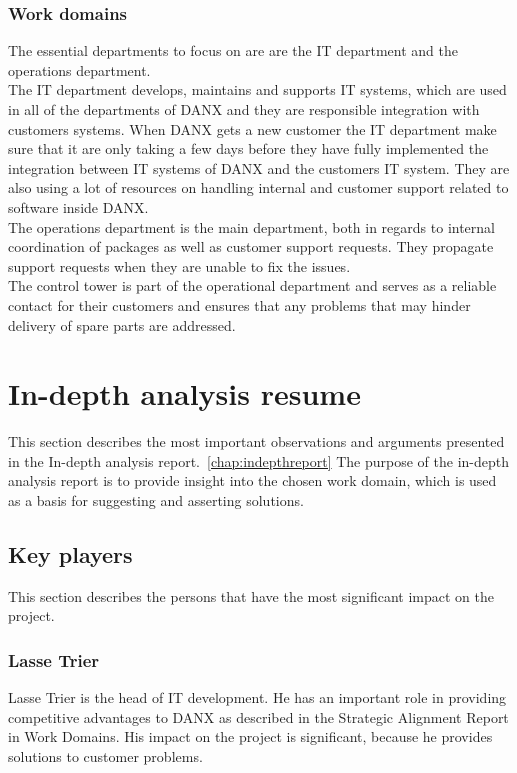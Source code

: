 \subsubsection{Work domains}
The essential departments to focus on are are the IT department and the operations department.\\
The IT department develops, maintains and supports IT systems\cite{lasse015}, which are used in all of the departments of DANX and they are responsible integration with customers systems\cite{lasse008}. When DANX gets a new customer the IT department make sure that it are only taking a few days\cite{lasse008} before they have fully implemented the integration between IT systems of DANX and the customers IT system. They are also using a lot of resources on handling internal and customer support related to software inside DANX.\cite{lasse016}\\
The operations department is the main department, both in regards to internal coordination of packages as well as customer support requests.\cite{gert004} They propagate support requests when they are unable to fix the issues.\cite{lasse017}\\
The control tower is part of the operational department and serves as a reliable contact for their customers and ensures that any problems that may hinder delivery of spare parts are addressed\cite{gert004}.\\

\section{In-depth analysis resume}
This section describes the most important observations and arguments presented in the In-depth analysis report.~\ref{chap:indepthreport} The purpose of the in-depth analysis report is to provide insight into the chosen work domain, which is used as a basis for suggesting and asserting solutions.

\subsection{Key players}
This section describes the persons that have the most significant impact on the project.

\subsubsection{Lasse Trier}
Lasse Trier is the head of IT development. He has an important role in providing competitive advantages to DANX as described in the Strategic Alignment Report in Work Domains. His impact on the project is significant, because he provides solutions to customer problems.

